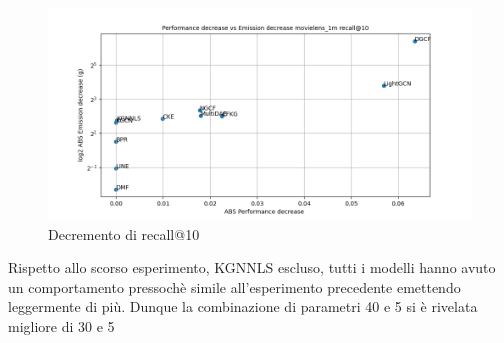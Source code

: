 \begin{figure}[H]
    \centering
     \includegraphics[width=\textwidth]{images/decrement_recall@10_movielens_1m_30_5.png}
    \caption{Decremento di recall@10}
\end{figure}
\noindent Rispetto allo scorso esperimento, KGNNLS escluso, tutti i modelli hanno avuto un comportamento pressochè simile all'esperimento precedente emettendo leggermente di più. Dunque la combinazione di parametri 40 e 5 si è rivelata migliore di 30 e 5

